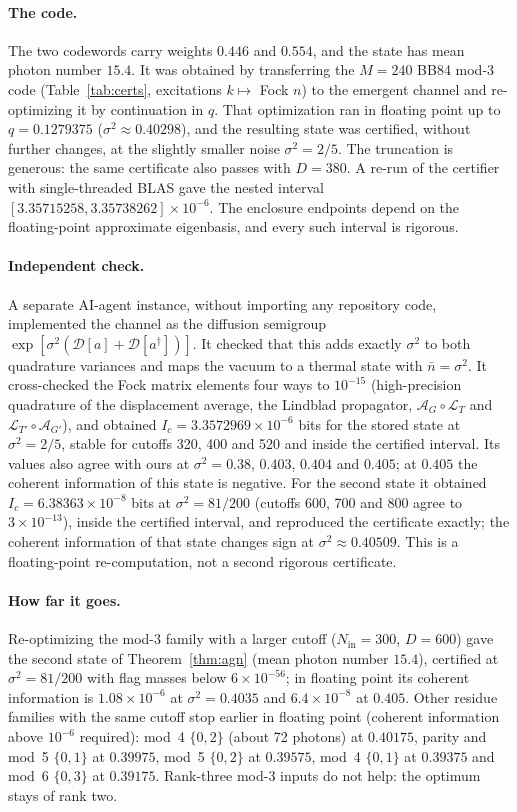 \documentclass[aps,pra,reprint,superscriptaddress,nofootinbib,longbibliography,floatfix]{revtex4-2}
\theoremstyle{remark}
\newcommand{\Ic}{I_c}
\newcommand{\Amp}{\mathcal{A}}
\newcommand{\Loss}{\mathcal{L}}
\begin{document}
\paragraph*{The code.} The two codewords carry weights $0.446$ and $0.554$, and the state has mean photon
number $15.4$. It was obtained by transferring the $M=240$ BB84 mod-3 code (Table~\ref{tab:certs},
excitations $k\mapsto$ Fock $n$) to the emergent channel and re-optimizing it by continuation in $q$.
That optimization ran in floating point up to $q=0.1279375$ ($\sigma^2\approx0.40298$), and the
resulting state was certified, without further changes, at the slightly smaller noise $\sigma^2=2/5$.
The truncation is generous: the same certificate also passes with $D=380$. A re-run of the
certifier with single-threaded BLAS gave the nested interval $[3.35715258,3.35738262]\times10^{-6}$.
The enclosure endpoints depend on the floating-point approximate eigenbasis, and every such interval is
rigorous.

\paragraph*{Independent check.} A separate AI-agent instance, without importing any repository code,
implemented the channel as the diffusion semigroup $\exp[\sigma^2(\mathcal D[a]+\mathcal D[a^\dagger])]$.
It checked that this adds exactly $\sigma^2$ to both quadrature variances and maps the vacuum to a
thermal state with $\bar n=\sigma^2$. It cross-checked the Fock matrix elements four ways to $10^{-15}$
(high-precision quadrature of the displacement average, the Lindblad propagator, $\Amp_G\circ\Loss_T$
and $\Loss_{T'}\circ\Amp_{G'}$), and obtained $\Ic=3.3572969\times10^{-6}$ bits for the stored state at
$\sigma^2=2/5$, stable for cutoffs 320, 400 and 520 and inside the certified interval. Its values also
agree with ours at $\sigma^2=0.38$, $0.403$, $0.404$ and $0.405$; at $0.405$ the coherent information of
this state is negative. For the second state it obtained $\Ic=6.38363\times10^{-8}$ bits at
$\sigma^2=81/200$ (cutoffs 600, 700 and 800 agree to $3\times10^{-13}$), inside the certified interval,
and reproduced the certificate exactly; the coherent information of that state changes sign at
$\sigma^2\approx0.40509$. This is a floating-point re-computation, not a second rigorous certificate.

\paragraph*{How far it goes.} Re-optimizing the mod-3 family with a larger cutoff ($N_{\mathrm{in}}=300$,
$D=600$) gave the second state of Theorem~\ref{thm:agn} (mean photon number $15.4$), certified at
$\sigma^2=81/200$ with flag masses below $6\times10^{-56}$; in floating point its coherent information is
$1.08\times10^{-6}$ at $\sigma^2=0.4035$ and $6.4\times10^{-8}$ at $0.405$. Other residue families with the same cutoff stop earlier in floating point
(coherent information above $10^{-6}$ required): mod~4 $\{0,2\}$ (about 72 photons) at $0.40175$, parity
and mod~5 $\{0,1\}$ at $0.39975$, mod~5 $\{0,2\}$ at $0.39575$, mod~4 $\{0,1\}$ at $0.39375$ and mod~6
$\{0,3\}$ at $0.39175$. Rank-three mod-3 inputs do not help: the optimum stays of rank two.
\end{document}
